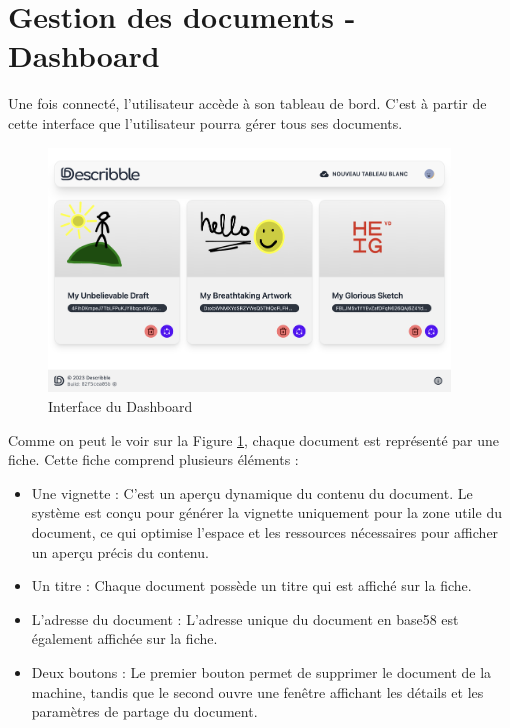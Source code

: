 \section{Gestion des documents - Dashboard}

Une fois connecté, l'utilisateur accède à son tableau de bord. C'est à partir de cette interface que l'utilisateur pourra gérer tous ses documents.

\begin{figure}[H]
    \centering
    \includegraphics[width=0.95\textwidth]{assets/figures/describble-dashboard.png}
    \caption{Interface du Dashboard}
    \label{fig:dashboard}
\end{figure}

Comme on peut le voir sur la Figure \ref{fig:dashboard}, chaque document est représenté par une fiche. Cette fiche comprend plusieurs éléments :

\begin{itemize}
    \item Une vignette : C'est un aperçu dynamique du contenu du document. Le système est conçu pour générer la vignette uniquement pour la zone utile du document, ce qui optimise l'espace et les ressources nécessaires pour afficher un aperçu précis du contenu.
    \item Un titre : Chaque document possède un titre qui est affiché sur la fiche.
    \item L'adresse du document : L'adresse unique du document en base58 est également affichée sur la fiche.
    \item Deux boutons : Le premier bouton permet de supprimer le document de la machine, tandis que le second ouvre une fenêtre affichant les détails et les paramètres de partage du document.
\end{itemize}

